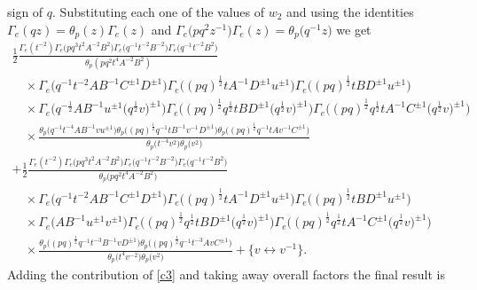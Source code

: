 \documentclass[a4paper,12pt]{article}
\begin{document}
sign of $q$. Substituting each one of the values of $w_2$ and using the identities $\Gamma_e(qz)=\theta_p(z)\Gamma_e(z)$ and $\Gamma_e\big(pq^2z^{-1}\big)\Gamma_e(z)=\theta_p\big(q^{-1}z\big)$ we get
\begin{gather*}
\frac12 \frac{\Gamma_e(t^{-2})\Gamma_e\big(pq^3t^2A^{-2}B^2\big)\Gamma_e\big(q^{-1}t^{-2}B^{-2}\big)\Gamma_e\big(q^{-1}t^{-2}B^2\big)}
{\theta_p(pq^2t^4A^{-2}B^2)}\\
\quad{}\times\Gamma_e\big(q^{-1}t^{-2}A B^{-1}C^{\pm1}D^{\pm1}\big)\Gamma_e\big((pq)^\frac12 tA^{-1} D^{\pm1}u^{\pm1}\big)\Gamma_e\big((pq)^\frac12 t B D^{\pm1}u^{\pm1}\big)\\
\quad{}\times\Gamma_e\big(q^{-\frac12}A B^{-1}u^{\pm1}\big(q^\frac12 v\big)^{\pm1}\big)\Gamma_e\big((pq)^\frac12 q^\frac12 t B D^{\pm1}\big(q^\frac12 v\big)^{\pm1}\big)\Gamma_e\big((pq)^\frac12 q^\frac12 t A^{-1} C^{\pm1} \big(q^\frac12 v\big)^{\pm1}\big) \\
\quad{}\times\frac{\theta_p\big(q^{-1}t^{-4}AB^{-1}vu^{\pm1}\big)\theta_p\big((pq)^\frac12 q^{-1} t B^{-1}v^{-1}D^{\pm1}\big)\theta_p\big((pq)^\frac12 q^{-1}t A v^{-1} C^{\pm1}\big)}{\theta_p\big(t^{-4}v^2\big)\theta_p\big(v^2\big)}\\
+ \frac12 \frac{\Gamma_e(t^{-2})\Gamma_e\big(pq^3t^2A^{-2}B^2\big)\Gamma_e\big(q^{-1}t^{-2}B^{-2}\big)\Gamma_e\big(q^{-1}t^{-2}B^2\big)}
{\theta_p\big(pq^2t^4A^{-2}B^2\big)}\\
\quad{}\times\Gamma_e\big(q^{-1}t^{-2}A B^{-1}C^{\pm1}D^{\pm1}\big)\Gamma_e\big((pq)^\frac12 tA^{-1} D^{\pm1}u^{\pm1}\big)\Gamma_e\big((pq)^\frac12 t B D^{\pm1}u^{\pm1}\big)\\
\quad{}\times\Gamma_e\big(A B^{-1}u^{\pm1} v^{\pm1}\big)\Gamma_e\big((pq)^\frac12 q^\frac12 t B D^{\pm1}\big(q^\frac12 v\big)^{\pm1}\big)\Gamma_e\big((pq)^\frac12 q^\frac12 t A^{-1} C^{\pm1} \big(q^\frac12 v\big)^{\pm1}\big) \\
\quad{}\times\frac{\theta_p\big((pq)^\frac12 q^{-1} t^{-3} B^{-1}vD^{\pm1}\big)\theta_p\big((pq)^\frac12 q^{-1}t^{-3} A v C^{\pm1}\big)}
{\theta_p\big(t^{4}v^{-2}\big)\theta_p\big(v^2\big)} + \big\{v \leftrightarrow v^{-1} \big\} .
\end{gather*}
Adding the contribution of \eqref{c3} and taking away overall factors the final result is
\end{document}

